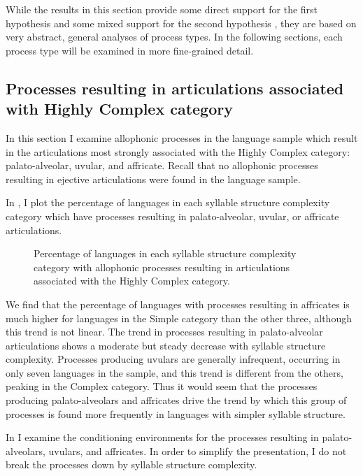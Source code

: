   While the results in this section provide some direct support for the first hypothesis  and some mixed support for the second hypothesis , they are based on very abstract, general analyses of process types. In the following sections, each process type will be examined in more fine-grained detail.

\subsection{Processes resulting in articulations associated with Highly Complex category}\label{sec:7.3.2}

  In this section I examine allophonic processes in the language sample which result in the articulations most strongly associated with the Highly Complex category: palato-alveolar, uvular, and affricate. Recall that no allophonic processes resulting in ejective articulations were found in the language sample.

  In , I plot the percentage of languages in each syllable structure complexity category which have processes resulting in palato-alveolar, uvular, or affricate articulations.

\begin{figure}
\caption{\label{fig:7.6} Percentage of languages in each syllable structure complexity category with allophonic processes resulting in articulations associated with the Highly Complex category.}
\end{figure}
  We find that the percentage of languages with processes resulting in affricates is much higher for languages in the Simple category than the other three, although this trend is not linear. The trend in processes resulting in palato-alveolar articulations shows a moderate but steady decrease with syllable structure complexity. Processes producing uvulars are generally infrequent, occurring in only seven languages in the sample, and this trend is different from the others, peaking in the Complex category. Thus it would seem that the processes producing palato-alveolars and affricates drive the trend by which this group of processes is found more frequently in languages with simpler syllable structure.

  In  I examine the conditioning environments for the processes resulting in palato-alveolars, uvulars, and affricates. In order to simplify the presentation, I do not break the processes down by syllable structure complexity.

